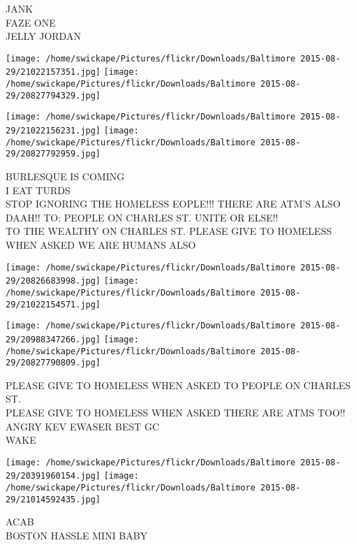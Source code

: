 \documentclass[10pt,letterpaper]{article}
\begin{document}
JANK\\
FAZE ONE\\
JELLY JORDAN
\pagebreak

\texttt{[image: /home/swickape/Pictures/flickr/Downloads/Baltimore 2015-08-29/21022157351.jpg]}
\texttt{[image: /home/swickape/Pictures/flickr/Downloads/Baltimore 2015-08-29/20827794329.jpg]}

\texttt{[image: /home/swickape/Pictures/flickr/Downloads/Baltimore 2015-08-29/21022156231.jpg]}
\texttt{[image: /home/swickape/Pictures/flickr/Downloads/Baltimore 2015-08-29/20827792959.jpg]}

BURLESQUE IS COMING\\
I EAT TURDS\\
STOP IGNORING THE HOMELESS EOPLE!!! THERE ARE ATM'S ALSO DAAH!! TO: PEOPLE ON CHARLES ST. UNITE OR ELSE!!\\
TO THE WEALTHY ON CHARLES ST.  PLEASE GIVE TO HOMELESS WHEN ASKED WE ARE HUMANS ALSO
\pagebreak

\texttt{[image: /home/swickape/Pictures/flickr/Downloads/Baltimore 2015-08-29/20826683998.jpg]}
\texttt{[image: /home/swickape/Pictures/flickr/Downloads/Baltimore 2015-08-29/21022154571.jpg]}

\texttt{[image: /home/swickape/Pictures/flickr/Downloads/Baltimore 2015-08-29/20988347266.jpg]}
\texttt{[image: /home/swickape/Pictures/flickr/Downloads/Baltimore 2015-08-29/20827790809.jpg]}

PLEASE GIVE TO HOMELESS WHEN ASKED TO PEOPLE ON CHARLES ST.\\
PLEASE GIVE TO HOMELESS WHEN ASKED THERE ARE ATMS TOO!!\\
ANGRY KEV EWASER BEST GC\\
WAKE
\pagebreak

\texttt{[image: /home/swickape/Pictures/flickr/Downloads/Baltimore 2015-08-29/20391960154.jpg]}
\texttt{[image: /home/swickape/Pictures/flickr/Downloads/Baltimore 2015-08-29/21014592435.jpg]}

ACAB\\
BOSTON HASSLE MINI BABY
\pagebreak
\end{document}
